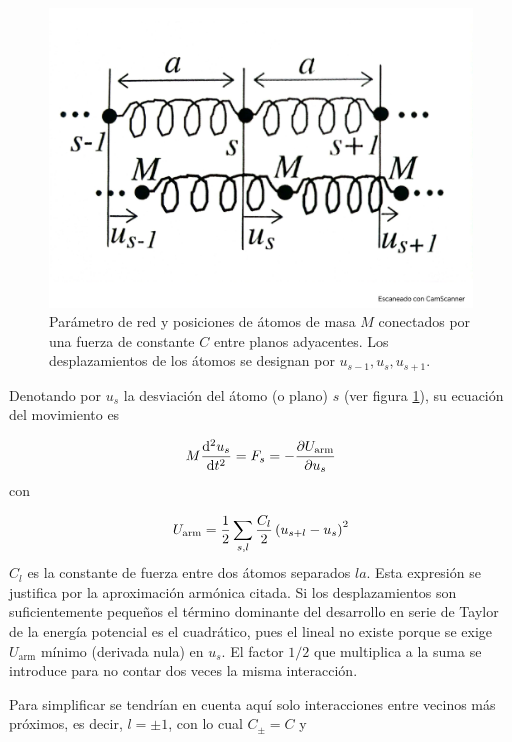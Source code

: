 \begin{figure}[h!] \centering
    \includegraphics[scale=0.45]{Cuerpo/Ch_04/Fotos libro 1.pdf}
    \caption{Parámetro de red y posiciones de átomos de masa $M$ conectados por una fuerza de constante $C$ entre planos adyacentes. Los desplazamientos de los átomos se designan por $u_{s-1},u_{s},u_{s+1}$.}
    \label{Fig:04-01}
\end{figure}    

Denotando por $u_s$ la desviación del átomo (o plano) $s$ (ver figura \ref{Fig:04-01}), su ecuación del movimiento es

\begin{equation}
	M \frac{\mathrm{d} ^2 u_s}{\mathrm{d} t^2} = F_s = - \frac{\partial U_{\text{arm}}}{\partial u_s} \label{Ec:04-01-02}
\end{equation}
con 

\begin{equation}
	U_{\text{arm}} = \frac{1}{2} \sum_{s,l} \frac{C_l}{2} \left( u_{s+l}-u_s \right)^2
\end{equation}
$C_l$ es la constante de fuerza entre dos átomos separados $la$. Esta expresión se justifica por la aproximación armónica citada. Si los desplazamientos son suficientemente pequeños el término dominante del desarrollo en serie de Taylor de la energía potencial es el cuadrático, pues el lineal no existe porque se exige $U_{\text{arm}}$ mínimo (derivada nula) en $u_s$. El factor $1/2$ que multiplica a la suma se introduce para no contar dos veces la misma interacción. 

Para simplificar se tendrían en cuenta aquí solo interacciones entre vecinos más próximos, es decir, $l=\pm 1$, con lo cual $C_\pm = C$ y 

